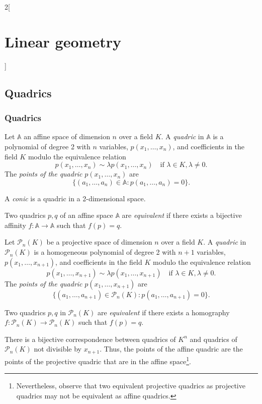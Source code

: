 \documentclass[../../../main.tex]{subfiles}
\begin{document}
\begin{multicols}{2}[\section{Linear geometry}]
  \subsection{Quadrics}
  \subsubsection{Quadrics}
  \begin{definition}
    Let $\mathbb{A}$ an affine space of dimension $n$ over a field $K$. A \emph{quadric} in $\mathbb{A}$ is a polynomial of degree 2 with $n$ variables, $p(x_1,\ldots,x_n)$, and coefficients in the field $K$ modulo the equivalence relation $$p(x_1,\ldots,x_n)\sim\lambda p(x_1,\ldots,x_n)\quad\text{if }\lambda\in K,\lambda\ne0.$$ The \emph{points of the quadric} $p(x_1,\ldots,x_n)$ are $$\{(a_1,\ldots,a_n)\in\mathbb{A}:p(a_1,\ldots,a_n)=0\}.$$
  \end{definition}
  \begin{definition}
    A \emph{conic} is a quadric in a 2-dimensional space.
  \end{definition}
  \begin{definition}
    Two quadrics $p,q$ of an affine space $\mathbb{A}$ are \emph{equivalent} if there exists a bijective affinity $f:\mathbb{A}\rightarrow\mathbb{A}$ such that $f(p)=q$.
  \end{definition}
  \begin{definition}
    Let $\mathcal{P}_n(K)$ be a projective space of dimension $n$ over a field $K$. A \emph{quadric} in $\mathcal{P}_n(K)$ is a homogeneous polynomial of degree 2 with $n+1$ variables, $p(x_1,\ldots,x_{n+1})$, and coefficients in the field $K$ modulo the equivalence relation $$p(x_1,\ldots,x_{n+1})\sim\lambda p(x_1,\ldots,x_{n+1})\quad\text{if }\lambda\in K,\lambda\ne0.$$ The \emph{points of the quadric} $p(x_1,\ldots,x_{n+1})$ are $$\{(a_1,\ldots,a_{n+1})\in\mathcal{P}_n(K):p(a_1,\ldots,a_{n+1})=0\}.$$
  \end{definition}
  \begin{definition}
    Two quadrics $p,q$ in $\mathcal{P}_n(K)$ are \emph{equivalent} if there exists a homography $f:\mathcal{P}_n(K)\rightarrow\mathcal{P}_n(K)$ such that $f(p)=q$.
  \end{definition}
  \begin{theorem}
    There is a bijective correspondence between quadrics of $K^n$ and quadrics of $\mathcal{P}_n(K)$ not divisible by $x_{n+1}$. Thus, the points of the affine quadric are the points of the projective quadric that are in the affine space\footnote{Nevertheless, observe that two equivalent projective quadrics as projective quadrics may not be equivalent as affine quadrics.}.

\end{theorem}
\end{multicols}
\end{document}
